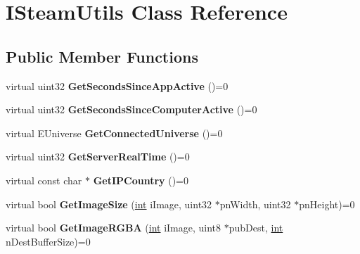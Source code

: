 \hypertarget{classISteamUtils}{}\section{I\+Steam\+Utils Class Reference}
\label{classISteamUtils}
\subsection*{Public Member Functions}
\begin{DoxyCompactItemize}
\item 
\hypertarget{classISteamUtils_afd6e42591223d603ee36b3614fe8f87c}{}virtual uint32 {\bfseries Get\+Seconds\+Since\+App\+Active} ()=0\label{classISteamUtils_afd6e42591223d603ee36b3614fe8f87c}

\item 
\hypertarget{classISteamUtils_a146505b28989619a292d5e6405f86abe}{}virtual uint32 {\bfseries Get\+Seconds\+Since\+Computer\+Active} ()=0\label{classISteamUtils_a146505b28989619a292d5e6405f86abe}

\item 
\hypertarget{classISteamUtils_ab43bc9b258f3742cb5d09660d7cf7446}{}virtual E\+Universe {\bfseries Get\+Connected\+Universe} ()=0\label{classISteamUtils_ab43bc9b258f3742cb5d09660d7cf7446}

\item 
\hypertarget{classISteamUtils_a0002cdef3d913b0ab024d023e3cef831}{}virtual uint32 {\bfseries Get\+Server\+Real\+Time} ()=0\label{classISteamUtils_a0002cdef3d913b0ab024d023e3cef831}

\item 
\hypertarget{classISteamUtils_adfec6d1673d1f893ac04995f566b139e}{}virtual const char $\ast$ {\bfseries Get\+I\+P\+Country} ()=0\label{classISteamUtils_adfec6d1673d1f893ac04995f566b139e}

\item 
\hypertarget{classISteamUtils_a831105a543f93c49c152a80b30078099}{}virtual bool {\bfseries Get\+Image\+Size} (\hyperlink{SDL__thread_8h_a6a64f9be4433e4de6e2f2f548cf3c08e}{int} i\+Image, uint32 $\ast$pn\+Width, uint32 $\ast$pn\+Height)=0\label{classISteamUtils_a831105a543f93c49c152a80b30078099}

\item 
\hypertarget{classISteamUtils_a097977ac0c242380be19d5e91676f219}{}virtual bool {\bfseries Get\+Image\+R\+G\+B\+A} (\hyperlink{SDL__thread_8h_a6a64f9be4433e4de6e2f2f548cf3c08e}{int} i\+Image, uint8 $\ast$pub\+Dest, \hyperlink{SDL__thread_8h_a6a64f9be4433e4de6e2f2f548cf3c08e}{int} n\+Dest\+Buffer\+Size)=0\label{classISteamUtils_a097977ac0c242380be19d5e91676f219}


\end{DoxyCompactItemize}
